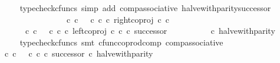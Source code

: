 \begin{isabellebody}
\ \ \ \ \ \ \isamarkupfalse%
\ {\isacharparenleft}{\kern0pt}typecheck{\isacharunderscore}{\kern0pt}cfuncs{\isacharcomma}{\kern0pt}\ simp\ add{\isacharcolon}{\kern0pt}\ comp{\isacharunderscore}{\kern0pt}associative{}\ halve{\isacharunderscore}{\kern0pt}with{\isacharunderscore}{\kern0pt}parity{\isacharunderscore}{\kern0pt}successor{\isacharparenright}{\kern0pt}\isanewline
\ \ \ \ \isamarkupfalse%
\ \isamarkupfalse%
\ {\isachardoublequoteopen}{\isachardot}{\kern0pt}{\isachardot}{\kern0pt}{\isachardot}{\kern0pt}\ {\isacharequal}{\kern0pt}\ \isanewline
\ \ \ \ \ \ \ \ {\isacharparenleft}{\kern0pt}{\isacharparenleft}{\kern0pt}{\isacharparenleft}{\kern0pt}{\isasymt}\ {\isasymcirc}\isactrlsub c\ {\isasymbeta}\isactrlbsub {\isasymnat}\isactrlsub c\isactrlesub {\isacharparenright}{\kern0pt}\ {\isasymamalg}\ {\isacharparenleft}{\kern0pt}{\isasymf}\ {\isasymcirc}\isactrlsub c\ {\isasymbeta}\isactrlbsub {\isasymnat}\isactrlsub c\isactrlesub {\isacharparenright}{\kern0pt}\ {\isasymcirc}\isactrlsub c\ right{\isacharunderscore}{\kern0pt}coproj\ {\isasymnat}\isactrlsub c\ {\isasymnat}\isactrlsub c{\isacharparenright}{\kern0pt}\isanewline
\ \ \ \ \ \ \ \ \ \ {\isasymamalg}\ \isanewline
\ \ \ \ \ \ \ \ {\isacharparenleft}{\kern0pt}{\isacharparenleft}{\kern0pt}{\isasymt}\ {\isasymcirc}\isactrlsub c\ {\isasymbeta}\isactrlbsub {\isasymnat}\isactrlsub c\isactrlesub {\isacharparenright}{\kern0pt}\ {\isasymamalg}\ {\isacharparenleft}{\kern0pt}{\isasymf}\ {\isasymcirc}\isactrlsub c\ {\isasymbeta}\isactrlbsub {\isasymnat}\isactrlsub c\isactrlesub {\isacharparenright}{\kern0pt}\ {\isasymcirc}\isactrlsub c\ left{\isacharunderscore}{\kern0pt}coproj\ {\isasymnat}\isactrlsub c\ {\isasymnat}\isactrlsub c\ {\isasymcirc}\isactrlsub c\ successor{\isacharparenright}{\kern0pt}{\isacharparenright}{\kern0pt}\isanewline
\ \ \ \ \ \ \ \ \ \ {\isasymcirc}\isactrlsub c\ halve{\isacharunderscore}{\kern0pt}with{\isacharunderscore}{\kern0pt}parity{\isachardoublequoteclose}\isanewline
\ \ \ \ \ \ \isamarkupfalse%
\ {\isacharparenleft}{\kern0pt}typecheck{\isacharunderscore}{\kern0pt}cfuncs{\isacharcomma}{\kern0pt}\ smt\ cfunc{\isacharunderscore}{\kern0pt}coprod{\isacharunderscore}{\kern0pt}comp\ comp{\isacharunderscore}{\kern0pt}associative{}{\isacharparenright}{\kern0pt}\isanewline
\ \ \ \ \isamarkupfalse%
\ \isamarkupfalse%
\ {\isachardoublequoteopen}{\isachardot}{\kern0pt}{\isachardot}{\kern0pt}{\isachardot}{\kern0pt}\ {\isacharequal}{\kern0pt}\ {\isacharparenleft}{\kern0pt}{\isacharparenleft}{\kern0pt}{\isasymf}\ {\isasymcirc}\isactrlsub c\ {\isasymbeta}\isactrlbsub {\isasymnat}\isactrlsub c\isactrlesub {\isacharparenright}{\kern0pt}\ {\isasymamalg}\ {\isacharparenleft}{\kern0pt}{\isasymt}\ {\isasymcirc}\isactrlsub c\ {\isasymbeta}\isactrlbsub {\isasymnat}\isactrlsub c\isactrlesub \ {\isasymcirc}\isactrlsub c\ successor{\isacharparenright}{\kern0pt}{\isacharparenright}{\kern0pt}\ {\isasymcirc}\isactrlsub c\ halve{\isacharunderscore}{\kern0pt}with{\isacharunderscore}{\kern0pt}parity{\isachardoublequoteclose}\isanewline

\end{isabellebody}
